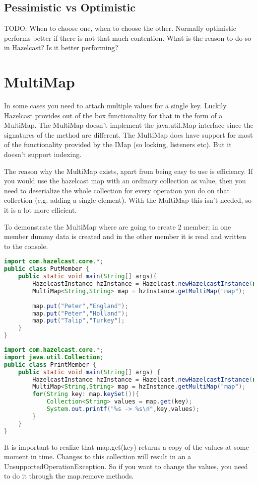 \subsection{Pessimistic vs Optimistic}
TODO: When to choose one, when to choose the other. Normally optimistic performs better if there is not that much contention. What is the reason to do so in Hazelcast? Is it better performing?

\section{MultiMap}
In some cases you need to attach multiple values for a single key. Luckily Hazelcast provides out of the box functionality for that in the form of a MultiMap. The MultiMap doesn't implement the java.util.Map interface since the signatures of the method are different. The MultiMap does have support for most of the functionality provided by the IMap (so locking, listeners etc). But it doesn't support indexing.

The reason why the MultiMap exists, apart from being easy to use is efficiency. If you would use the hazelcast map with an ordinary collection as value, then you need to deserialize the whole collection for every operation you do on that collection (e.g. adding a single element). With the MultiMap this isn't needed, so it is a lot more efficient.

To demonstrate the MultiMap where are going to create 2 member; in one member dummy data is created and in the other member it is read and written to the console.
\begin{lstlisting}[language=java]
import com.hazelcast.core.*;
public class PutMember {
    public static void main(String[] args){
        HazelcastInstance hzInstance = Hazelcast.newHazelcastInstance(null);
        MultiMap<String,String> map = hzInstance.getMultiMap("map");
        
        map.put("Peter","England");
        map.put("Peter","Holland");
        map.put("Talip","Turkey");
    }
}
\end{lstlisting}

\begin{lstlisting}[language=java]
import com.hazelcast.core.*;
import java.util.Collection;
public class PrintMember {
    public static void main(String[] args) {
        HazelcastInstance hzInstance = Hazelcast.newHazelcastInstance(null);
        MultiMap<String,String> map = hzInstance.getMultiMap("map");
        for(String key: map.keySet()){
            Collection<String> values = map.get(key);
            System.out.printf("%s -> %s\n",key,values);
        }
    }
}
\end{lstlisting}
It is important to realize that map.get(key) returns a copy of the values at some moment in time. Changes to this collection will result in an a UnsupportedOperationException. So if you want to change the values, you need to do it through the map.remove methods.

